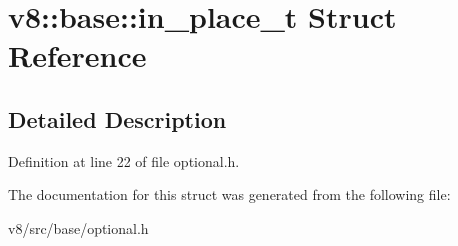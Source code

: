 \hypertarget{structv8_1_1base_1_1in__place__t}{}\section{v8\+:\+:base\+:\+:in\+\_\+place\+\_\+t Struct Reference}
\label{structv8_1_1base_1_1in__place__t}


\subsection{Detailed Description}


Definition at line 22 of file optional.\+h.



The documentation for this struct was generated from the following file\+:\begin{DoxyCompactItemize}
\item 
v8/src/base/optional.\+h\end{DoxyCompactItemize}
